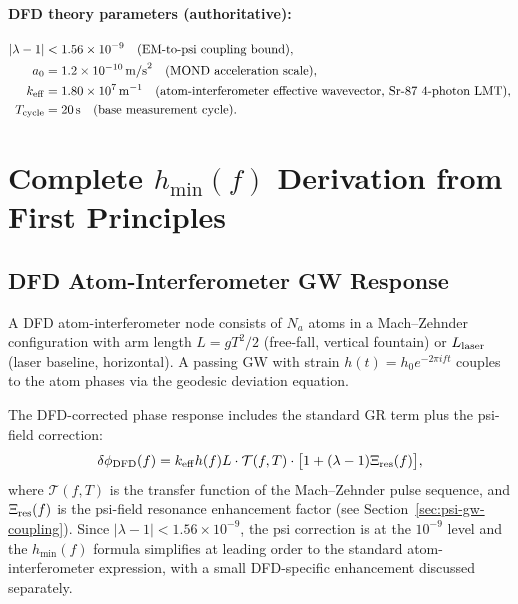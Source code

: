 \documentclass[11pt]{article}
\theoremstyle{definition}
\theoremstyle{remark}
\newcommand{\lambdaone}{|\lambda-1|}
\newcommand{\aone}{a_0}
\newcommand{\ee}[1]{\times10^{#1}}
\begin{document}
\paragraph{DFD theory parameters (authoritative):}
\begin{align*}
\lambdaone &< 1.56\ee{-9} \quad \text{(EM-to-psi coupling bound)}, \\
\aone &= 1.2\ee{-10}\,\mathrm{m/s}^2 \quad \text{(MOND acceleration scale)}, \\
k_{\rm eff} &= 1.80\ee{7}\,\mathrm{m}^{-1} \quad \text{(atom-interferometer effective wavevector, Sr-87 4-photon LMT)}, \\
T_{\rm cycle} &= 20\,\mathrm{s} \quad \text{(base measurement cycle)}.
\end{align*}

\section{Complete $h_{\min}(f)$ Derivation from First Principles}
\label{sec:hmin-derivation}

\subsection{DFD Atom-Interferometer GW Response}

A DFD atom-interferometer node consists of $N_a$ atoms in a Mach--Zehnder
configuration with arm length $L = g T^2/2$ (free-fall, vertical fountain)
or $L_{\rm laser}$ (laser baseline, horizontal).  A passing GW with strain
$h(t) = h_0 e^{-2\pi i f t}$ couples to the atom phases via the geodesic
deviation equation.

The DFD-corrected phase response includes the standard GR term plus the
psi-field correction:
\begin{equation}
\delta\phi_{\rm DFD}(f) = k_{\rm eff} h(f) L \cdot \mathcal{T}(f,T)
\cdot \bigl[1 + (\lambda - 1) \Xi_{\rm res}(f)\bigr],
\label{eq:DFD-response}
\end{equation}
where $\mathcal{T}(f,T)$ is the transfer function of the Mach--Zehnder pulse
sequence, and $\Xi_{\rm res}(f)$ is the psi-field resonance enhancement factor
(see Section~\ref{sec:psi-gw-coupling}).  Since $\lambdaone < 1.56\ee{-9}$, the
psi correction is at the $10^{-9}$ level and the $h_{\min}(f)$ formula
simplifies at leading order to the standard atom-interferometer expression,
with a small DFD-specific enhancement discussed separately.
\end{document}
